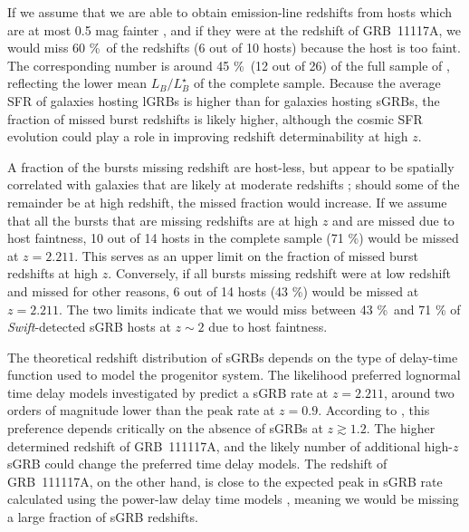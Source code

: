 \documentclass[longauth]{aa}    %
\begin{document}
If we assume that we are able to obtain emission-line redshifts from hosts which
are at most 0.5 mag fainter \citep[$R < 24.5$~mag;][]{Kruhler2012}, and if they were at the redshift of GRB~11117A,  we
would miss 60 \%\ of the redshifts (6 out of 10 hosts) because  the
host is too faint. The corresponding
number is around 45 \%\ (12 out of 26) of the full sample of
\citet{Berger2014}, reflecting the lower mean $L_B/L^{\star}_{B}$ of the
complete sample. Because the average SFR of galaxies hosting lGRBs is higher
than for galaxies hosting sGRBs, the fraction of missed burst redshifts is
likely higher, although the cosmic SFR evolution could play a role in improving
redshift determinability at high $z$.

A fraction of the bursts missing redshift are host-less, but appear to be
spatially correlated with galaxies that are likely at moderate redshifts
\citep{Tunnicliffe2014}; should some of the remainder be at high redshift,
the missed fraction would increase. If we assume that {all} the bursts
that are missing redshifts are at high $z$ and are missed due to host faintness, 10
out of 14 hosts in the complete sample (71 \%) would be missed at $z =
2.211$. This serves as an upper limit on the fraction of missed burst redshifts
at high $z$. Conversely, if all bursts missing redshift were at low redshift and
missed for other reasons, 6 out of 14 hosts (43 \%) would be missed at $z
= 2.211$. The two limits indicate that we would miss between 43 \%\ and 71 \%
of \textit{Swift}-detected sGRB hosts at $z \sim 2$ due to host faintness.

The theoretical redshift distribution of sGRBs depends on the type of delay-time
function used to model the progenitor system. The likelihood preferred lognormal
time delay models investigated by \citet{Wanderman2015} predict a sGRB rate at
$z = 2.211$, around two orders of magnitude lower than the peak rate at
$z = 0.9$. According to \citet{Wanderman2015}, this preference depends
critically on the absence of sGRBs at $z \gtrsim 1.2$. The higher determined
redshift of GRB~111117A, and the likely number of additional high-$z$ sGRB could
change the preferred time delay models. The redshift of GRB~111117A, on the
other hand, is close to the expected peak in sGRB rate calculated using the
power-law delay time models \citep{Behroozi2014, Wanderman2015, Ghirlanda2016},
meaning we would be missing a large fraction of sGRB redshifts.
\end{document}
